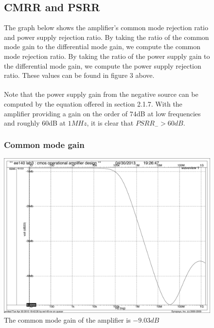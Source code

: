 \documentclass[]{article}
\begin{document}
		\begin{figure}
			\subsection{CMRR and PSRR}
			The graph below shows the amplifier's common mode rejection ratio and power supply rejection ratio. By taking the ratio of the common mode gain to the differential mode gain, we compute the common mode rejection ratio. By taking the ratio of the power supply gain to the differential mode gain, we compute the power supply rejection ratio. These values can be found in figure 3 above.\\
			\\
			Note that the power supply gain from the negative source can be computed by the equation offered in section 2.1.7. With the amplifier providing a gain on the order of $74$dB at low frequencies and roughly $60$dB at $1MHz$, it is clear that $PSRR_{-} > 60dB$.
				\subsubsection{Common mode gain}
				\includegraphics[width=1.1\textwidth]{cmrr_DC.pdf}
				\caption{The common mode gain of the amplifier is $-9.03dB$}
		\end{figure}
		
\end{document}
